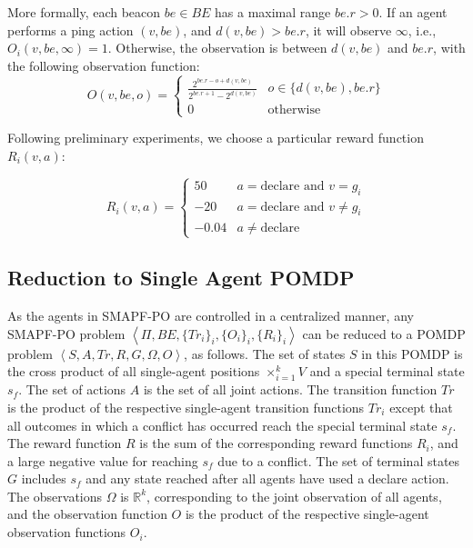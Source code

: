 \documentclass[letterpaper]{article} %
\newcommand{\tuple}[1]{\ensuremath{\left \langle #1 \right \rangle }}
\newcommand{\roni}[1]{ }
\begin{document}
More formally, each beacon $be\in BE$ has a maximal range $be.r>0$. 
If an agent performs a ping action $(v,be)$, and $d(v,be)>be.r$, it will observe $\infty$, i.e., $O_i(v,be,\infty)=1$. 
Otherwise, the observation is between $d(v, be)$ and $be.r$, with the following observation function: 
\begin{equation}
    O(v,be,o) = 
    \begin{cases}
        \frac{2^{be.r-o+d(v,be)}}{2^{be.r+1}-2^{d(v,be)}} & o\in\{d(v,be), be.r\} \\
        0 & \text{otherwise}
    \end{cases}
\end{equation}

Following preliminary experiments, we choose a particular reward function $R_i(v,a)$:


\begin{equation}
R_i(v, a) = \begin{cases}
    50 & a = \text{declare} \text{ and } v = g_i \\
    -20 & a = \text{declare} \text{ and } v \neq g_i \\   
    -0.04 & a \neq \text{declare} 
\end{cases}
\end{equation}




\subsection{Reduction to Single Agent POMDP}
\label{sec:reduction}
As the agents in SMAPF-PO are controlled in a centralized manner, any SMAPF-PO problem $\tuple{\Pi,BE,\{Tr_i\}_i, \{O_i\}_i, \{R_i\}_i}$ can be reduced to a POMDP problem $\tuple{S,A,Tr,R,G,\Omega,O}$, as follows. 
The set of states $S$ in this POMDP 
is the cross product of all single-agent positions $\times_{i=1}^k V$ and a special terminal state $s_f$. 
The set of actions $A$ is the set of all joint actions. 
The transition function $Tr$ is the product of the respective single-agent transition functions $Tr_i$ except that all outcomes in which a conflict has occurred reach the special terminal state $s_f$. 
The reward function $R$ is the sum of the corresponding reward functions $R_i$, and a large negative value for reaching $s_f$ due to a conflict.  
The set of terminal states $G$ includes $s_f$ and any state reached after all agents have used a declare action. 
The observations $\Omega$ is $\mathbb{R}^k$, corresponding to the joint observation of all agents, and the observation function $O$ is the product of the respective single-agent observation functions $O_i$. 
\end{document}

